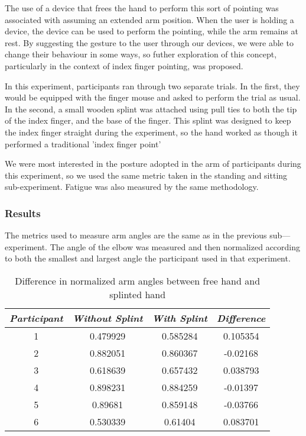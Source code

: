 The use of a device that frees the hand to perform this sort of pointing was associated with assuming an extended arm position. When the user is holding a device, the device can be used to perform the pointing, while the arm remains at rest. By suggesting the gesture to the user through our devices, we were able to change their behaviour in some ways, so futher exploration of this concept, particularly in the context of index finger pointing, was proposed.

In this experiment, participants ran through two separate trials. In the first, they would be equipped with the finger mouse and asked to perform the trial as usual. In the second, a small wooden splint was attached using pull ties to both the tip of the index finger, and the base of the finger. This splint was designed to keep the index finger straight during the experiment, so the hand worked as though it performed a traditional 'index finger point'

We were most interested in the posture adopted in the arm of participants during this experiment, so we used the same metric taken in the standing and sitting sub-experiment. Fatigue was also measured by the same methodology.

\subsubsection{Results}

The metrics used to measure arm angles are the same as in the previous sub---experiment. The angle of the elbow was measured and then normalized according to both the smallest and largest angle the participant used in that experiment. 

\begin{table}
\centering
\begin{tabular}{c | c | c | c}
\emph{Participant} & \emph{Without Splint} & \emph{With Splint} & \emph{Difference} \\
\hline
1 & 0.479929 & 0.585284 & 0.105354 \\
2 & 0.882051 & 0.860367 & -0.02168 \\
3 & 0.618639 & 0.657432 & 0.038793 \\
4 & 0.898231 & 0.884259 & -0.01397 \\
5 & 0.89681 & 0.859148 & -0.03766 \\
6 & 0.530339 & 0.61404 & 0.083701 \\
\end{tabular}
\caption{Difference in normalized arm angles between free hand and splinted hand}
\end{table}

